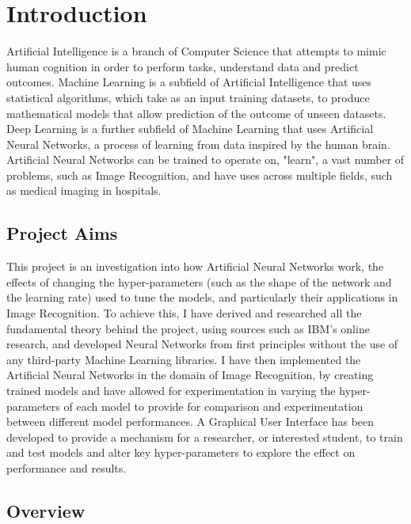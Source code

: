 \documentclass[./project-report/src/latex/project-report.tex]{subfiles}
\begin{document}
\maketitle

\clearpage
\section{Introduction}

Artificial Intelligence is a branch of Computer Science that attempts to mimic human cognition in order to perform tasks, understand data and predict outcomes. 
\cite{hunt2014artificial}
Machine Learning is a subfield of Artificial Intelligence that uses statistical algorithms, which take as an input training datasets, to produce mathematical models 
that allow prediction of the outcome of unseen datasets. Deep Learning is a further subfield of Machine Learning that uses Artificial Neural Networks, a process of 
learning from data inspired by the human brain. Artificial Neural Networks can be trained to operate on, "learn", a vast number of problems, such as Image Recognition, 
and have uses across multiple fields, such as medical imaging in hospitals.

\subsection{Project Aims}

This project is an investigation into how Artificial Neural Networks work, the effects of changing the hyper-parameters (such as the shape of the network and the 
learning rate) used to tune the models, and particularly their applications in Image Recognition. To achieve this, I have derived and researched all the fundamental 
theory behind the project, using sources such as IBM's online research, and developed Neural Networks from first principles without the use of any third-party Machine 
Learning libraries. I have then implemented the Artificial Neural Networks in the domain of Image Recognition, by creating trained models and have allowed for experimentation 
in varying the hyper-parameters of each model to provide for comparison and experimentation between different model performances. A Graphical User Interface has been developed 
to provide a mechanism for a researcher, or interested student, to train and test models and alter key hyper-parameters to explore the effect on performance and results.

\subsection{Overview}
\end{document}

